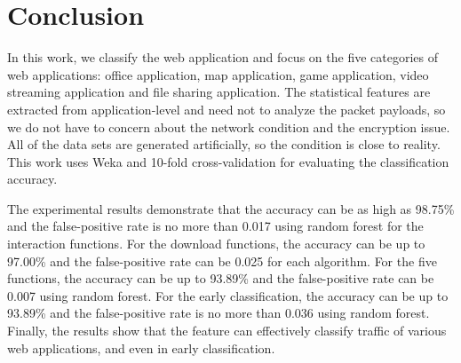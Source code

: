 \chapter{Conclusion}
\label{conclusion}

In this work, we classify the web application and focus on the five categories of web applications: office application, map application, game application, video streaming application and file sharing application. The statistical features are extracted from application-level and need not to analyze the packet payloads, so we do not have to concern about the network condition and the encryption issue. All of the data sets are generated artificially, so the condition is close to reality. This work uses Weka and 10-fold cross-validation for evaluating the classification accuracy.

The experimental results demonstrate that the accuracy can be as high as 98.75\% and the false-positive rate is no more than 0.017 using random forest for the interaction functions. For the download functions, the accuracy can be up to 97.00\% and the false-positive rate can be 0.025 for each algorithm. For the five functions, the accuracy can be up to 93.89\% and the false-positive rate can be 0.007 using random forest. For the early classification, the accuracy can be up to 93.89\% and the false-positive rate is no more than 0.036 using random forest. Finally, the results show that the feature can effectively classify traffic of various web applications, and even in early classification.